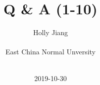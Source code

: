 \documentclass[UTF8,12pt]{article}
\title{Q \& A (1-10)}
\author
{Holly Jiang\\
\\
\normalsize{East China Normal Unversity}\\
\\
}
\date{2019-10-30}
\begin{document}
 

\begin{CJK}{UTF8}{gbsn}

\baselineskip24pt


\maketitle 





\end{CJK}
\end{document}
